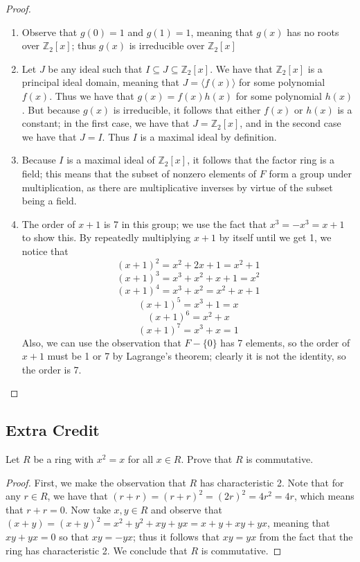 \documentclass{article}
\begin{document}
\begin{proof}
	\qquad
	\begin{enumerate}
		\item 
			Observe that $g(0) = 1$ and $g(1) = 1$, meaning that $g(x)$ has no roots
			over $\mathbb{Z}_2[x]$; thus $g(x)$ is irreducible over $\mathbb{Z}_2[x]$
		\item
			Let $J$ be any ideal such that $I \subseteq J \subseteq \mathbb{Z}_2[x]$.
			We have that $\mathbb{Z}_2[x]$ is a principal ideal domain, meaning that 
			$J = \langle f(x) \rangle$ for some polynomial $f(x)$. Thus we have that
			$g(x) = f(x)h(x)$ for some polynomial $h(x)$. But because $g(x)$ is 
			irreducible, it follows that either $f(x)$ or $h(x)$ is a constant;
			in the first case, we have that $J = \mathbb{Z}_2[x]$, and in the second
			case we have that $J = I$. Thus $I$ is a maximal ideal by definition.
		\item 
			Because $I$ is a maximal ideal of $\mathbb{Z}_2[x]$, it follows that 
			the factor ring is a field; this means that the subset of nonzero elements
			of $F$ form a group under multiplication, as there are multiplicative
			inverses by virtue of the subset being a field.
		\item 
			The order of $x + 1$ is 7 in this group; we use the fact that
			$x^3 = -x^3 = x + 1$ to show this. By repeatedly multiplying $x+1$ by
			itself until we get 1, we notice that
			\[ (x+1)^2=x^2+2x+1=x^2+1 \]
			\[ (x+1)^3=x^3+x^2+x+1=x^2 \]
			\[ (x+1)^4=x^3+x^2=x^2+x+1 \]
			\[ (x+1)^5=x^3+1=x \]
			\[ (x+1)^6=x^2+x \]
			\[ (x+1)^7=x^3+x=1 \]
			Also, we can use the observation that $F - \{0\}$ has 7 elements, so the
			order of $x + 1$ must be 1 or 7 by Lagrange's theorem; clearly it is not
			the identity, so the order is 7.

	\end{enumerate}
\end{proof}

\subsection*{Extra Credit}
Let $R$ be a ring with $x^2 = x$ for all $x \in R$. Prove that $R$ is commutative.

\begin{proof}
	First, we make the observation that $R$ has characteristic 2. Note that for any 
	$r \in R$, we have that $(r + r) = (r + r)^2 = (2r)^2 = 4r^2 = 4r$, which means 
	that $r + r = 0$. Now take $x, y \in R$ and observe that $(x + y) = (x+y)^2 = 
	x^2 + y^2 + xy + yx = x + y + xy + yx$, meaning that $xy + yx = 0$ so that 
	$xy = -yx$; thus it follows that $xy = yx$ from the fact that the ring has 
	characteristic 2. We conclude that $R$ is commutative. 
\end{proof}
\end{document}
